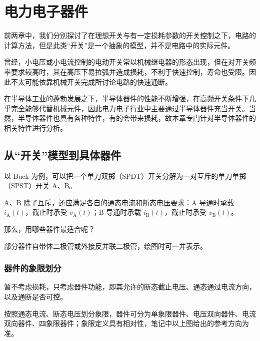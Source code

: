 
\chapter{电力电子器件}

前两章中，我们分别探讨了在理想开关与有一定损耗参数的开关控制之下，电路的计算方法，但是此类“开关”是一个抽象的模型，并不是电路中的实际元件。

曾经，小电压或小电流控制的电动开关常以机械继电器的形态出现，但在对开关频率要求较高时，其在高压下易拉弧并造成损耗，不利于快速控制，寿命也受限。因此不太可能依靠机械开关完成所讨论电路的快速通断。

在半导体工业的蓬勃发展之下，半导体器件的性能不断增强，在高频开关条件下几乎完全能够代替机械元件，因此电力电子行业中主要通过半导体器件充当开关。当然，半导体器件也具有各种特性，有的会带来损耗，故本章专门针对半导体器件的相关特性进行分析。

\section{从“开关”模型到具体器件}

以 Buck 为例，可以把一个单刀双掷（SPDT）开关分解为一对互斥的单刀单掷（SPST）开关 $\mathrm{A}$、$\mathrm{B}$。
\vspace{-0.3cm}


$\mathrm{A}$、$\mathrm{B}$ 除了互斥，还应满足各自的通态电流和断态电压要求：$\mathrm{A}$ 导通时承载 $i_{\mathrm{A}}(t)$，截止时承受 $v_{\mathrm{A}}(t)$；$\mathrm{B}$ 导通时承载 $i_{\mathrm{B}}(t)$，截止时承受 $v_{\mathrm{B}}(t)$。

那么，用哪些器件最适合呢？


部分器件自带体二极管或外接反并联二极管，绘图时可一并表示。

\subsection{器件的象限划分}

暂不考虑损耗，只考虑器件功能，即其允许的断态截止电压、通态通过电流方向，以及通断是否可控。


按照通态电流、断态电压划分象限，器件可分为单象限器件、电压双向器件、电流双向器件、四象限器件；象限定义具有相对性，笔记中以上图给出的参考方向为准。

